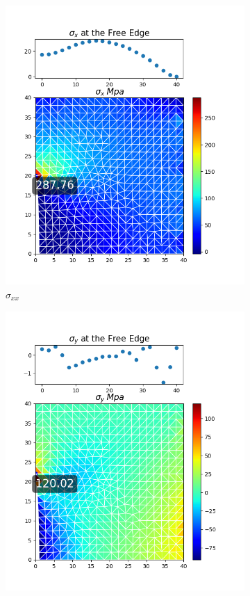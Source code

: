 \documentclass[twoside,twocolumn,10pt]{article}
\begin{document}
\begin{figure}[!ht]
  \begin{subfigure}[c]{0.26\textwidth}
    \includegraphics[width=1.\linewidth]{Q2_5/Q5_0.05_x_triangle.png}
    \caption{$\sigma_{xx}$}
    \label{fig:x_triangle_0.05}
  \end{subfigure}%
  \begin{subfigure}[c]{0.26\textwidth}
    \includegraphics[width=1.\linewidth]{Q2_5/Q5_0.05_y_triangle.png}

\end{subfigure}
\end{figure}
\end{document}
